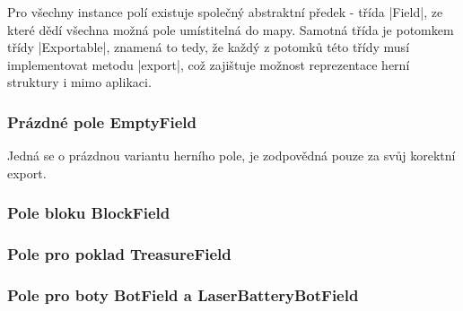 Pro všechny instance polí existuje společný abstraktní předek - třída \ic|Field|, ze které dědí všechna možná pole umístitelná do mapy. Samotná třída je potomkem třídy \ic|Exportable|, znamená to tedy, že každý z potomků této třídy musí implementovat metodu \ic|export|, což zajištuje možnost reprezentace herní struktury i mimo aplikaci.

\subsubsection{Prázdné pole EmptyField}

Jedná se o prázdnou variantu herního pole, je zodpovědná pouze za svůj korektní export.

\subsubsection{Pole bloku BlockField}
\subsubsection{Pole pro poklad TreasureField}
\subsubsection{Pole pro boty BotField a LaserBatteryBotField}

